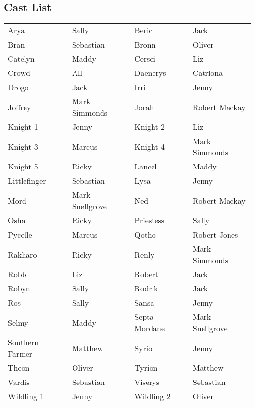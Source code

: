 \subsection*{Cast List}
\begin{tabular}{ll|ll}\\
Arya & Sally &  Beric & Jack\\
Bran & Sebastian &  Bronn & Oliver\\
Catelyn & Maddy &  Cersei & Liz\\
Crowd & All &  Daenerys & Catriona\\
Drogo & Jack &  Irri & Jenny\\
Joffrey & Mark Simmonds &  Jorah & Robert Mackay\\
Knight 1 & Jenny &  Knight 2 & Liz\\
Knight 3 & Marcus &  Knight 4 & Mark Simmonds\\
Knight 5 & Ricky &  Lancel & Maddy\\
Littlefinger & Sebastian &  Lysa & Jenny\\
Mord & Mark Snellgrove &  Ned & Robert Mackay\\
Osha & Ricky &  Priestess & Sally\\
Pycelle & Marcus &  Qotho & Robert Jones\\
Rakharo & Ricky &  Renly & Mark Simmonds\\
Robb & Liz &  Robert & Jack\\
Robyn & Sally &  Rodrik & Jack\\
Ros & Sally &  Sansa & Jenny\\
Selmy & Maddy &  Septa Mordane & Mark Snellgrove\\
Southern Farmer & Matthew &  Syrio & Jenny\\
Theon & Oliver &  Tyrion & Matthew\\
Vardis & Sebastian &  Viserys & Sebastian\\
Wildling 1 & Jenny &  Wildling 2 & Oliver\\
\end{tabular}
